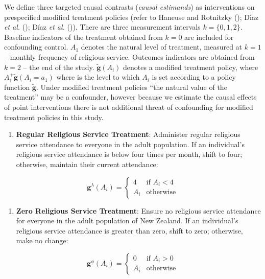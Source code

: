 \documentclass[
  single column]{article}
\providecommand{\tightlist}{%
  \setlength{\itemsep}{0pt}\setlength{\parskip}{0pt}}\usepackage{longtable,booktabs,array}
\begin{document}
We define three targeted causal contrasts (\emph{causal estimands}) as
interventions on prespecified modified treatment policies (refer to
Haneuse and Rotnitzky (); Dı́az
\emph{et al.} (); Díaz
\emph{et al.} ()). There are three
measurement intervals \(k = \{0,1,2\}\). Baseline indicators of the
treatment obtained from \(k = 0\) are included for confounding control.
\(A_1\) denotes the natural level of treatment, measured at \(k =1\) --
monthly frequency of religious service. Outcomes indicators are obtained
from \(k=2\) -- the end of the study. \(\mathbf{\tilde{g}}(A_i)\)
denotes a modified treatment policy, where
\(A^+_1\mathbf{\tilde{g}}(A_i = a_1)\) where is the level to which
\(A_i\) is set according to a policy function \(\mathbf{\tilde{g}}\).
Under modified treatment policies ``the natural value of the treatment''
may be a confounder, however because we estimate the causal effects of
point interventions there is not additional threat of confounding for
modified treatment policies in this study.

\begin{enumerate}
\def\labelenumi{\arabic{enumi}.}
\tightlist
\item
  \textbf{Regular Religious Service Treatment}: Administer regular
  religious service attendance to everyone in the adult population. If
  an individual's religious service attendance is below four times per
  month, shift to four; otherwise, maintain their current attendance:
\end{enumerate}

\[
\mathbf{g}^\lambda (A_i) = \begin{cases} 4 & \text{if } A_i < 4 \\ 
A_i & \text{otherwise} \end{cases}
\]

\begin{enumerate}
\def\labelenumi{\arabic{enumi}.}
\setcounter{enumi}{1}
\tightlist
\item
  \textbf{Zero Religious Service Treatment}: Ensure no religious service
  attendance for everyone in the adult population of New Zealand. If an
  individual's religious service attendance is greater than zero, shift
  to zero; otherwise, make no change:
\end{enumerate}

\[
\mathbf{g}^\phi (A_i) = \begin{cases} 0 & \text{if } A_i > 0 \\ 
A_i & \text{otherwise} \end{cases}
\]
\end{document}
